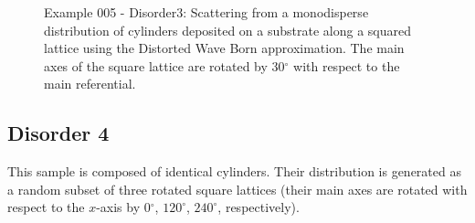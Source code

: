 \begin{figure}[H]
\hfill
{}
\hfill
{}
\hfill
\caption{Example 005 - Disorder3: Scattering from a monodisperse distribution of cylinders deposited on a substrate along a squared lattice using the Distorted Wave Born approximation. The main axes of the square lattice are rotated by 30$^{\circ}$ with respect to the main referential.}
\label{fig:PythonEx5Dis3}
\end{figure}


\subsection{Disorder 4}
This sample is composed of identical cylinders. Their distribution is generated as a random subset of three rotated square lattices (their main axes are rotated with respect to the $x$-axis by  0$^{\circ}$, $120^{\circ}$, $240^{\circ}$, respectively).

